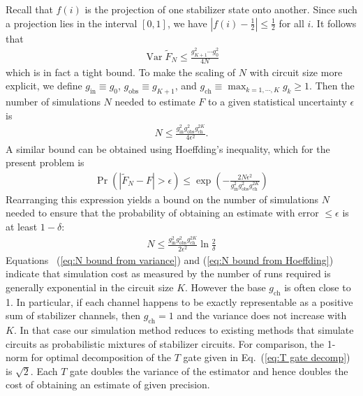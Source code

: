 \documentclass[twocolumn,pra]{revtex4}
\begin{document}
Recall that $f(i)$ is the projection of one stabilizer state onto another. Since such a projection lies in the interval $[0,1]$, we have $|f(i) - \frac{1}{2}| \le \frac{1}{2}$ for all $i$. It follows that
\begin{align}
\operatorname{Var}\tilde{F}_N \le \frac{ g_{K+1}^2 \cdots g_{0}^2 }{4N}
\end{align}
which is in fact a tight bound. To make the scaling of $N$ with circuit size more explicit, we define $g_{\text{in}} \equiv g_{0}$, $g_{\text{obs}} \equiv g_{K+1}$, and $ g_{\text{ch}} \equiv \max_{k=1,\cdots,K} g_k \ge 1$. Then the number of simulations $N$ needed to estimate $F$ to a given statistical uncertainty $\epsilon$ is
\begin{gather} \label{eq:N bound from variance}
N \le\frac{  g_{\text{in}}^2 g_{\text{obs}}^2 g_{\text{ch}}^{2K}  }{4\epsilon^2} .
\end{gather}
A similar bound can be obtained using Hoeffding's inequality, which for the present problem is
\begin{gather}
\Pr(|\tilde{F}_{N}-F|>\epsilon) \le \exp\left(-\frac{2N\epsilon^2}{  g_{\text{in}}^2 g_{\text{obs}}^2 g_{\text{ch}}^{2K} } \right)
\end{gather} 
Rearranging this expression yields a bound on the number of simulations $N$ needed to ensure that the probability of obtaining an estimate with error  $\le \epsilon$ is at least $1-\delta$:
\begin{gather} \label{eq:N bound from Hoeffding}
N \le \frac{ g_{\text{in}}^2 g_{\text{obs}}^2 g_{\text{ch}}^{2K} }{2\epsilon^2}   \ln \frac{2}{\delta}
\end{gather}
Equations ~(\ref{eq:N bound from variance}) and (\ref{eq:N bound from Hoeffding}) indicate that simulation cost as measured by the number of runs required is generally exponential in the circuit size $K$.
However the base $g_{\text{ch}}$ is often close to 1. 
In particular, if each channel happens to be exactly representable as a positive sum of stabilizer channels, then $g_{\text{ch}} = 1$ and the variance does not increase with $K$.
In that case our simulation method reduces to existing methods that simulate circuits as probabilistic mixtures of stabilizer circuits.
For comparison, the 1-norm for optimal decomposition of the $T$ gate given in Eq.~(\ref{eq:T gate decomp}) is $\sqrt{2}$. Each $T$ gate doubles the variance of the estimator and hence doubles the cost of obtaining an estimate of given precision.
\end{document}
